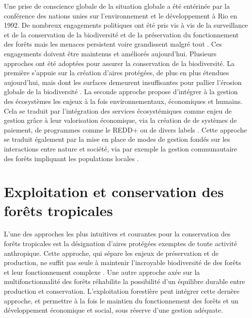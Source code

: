 \documentclass[
  11pt,
  french,
  A4paper,
  extrafontsizes,onecolumn,openright
  ]{memoir}
\begin{document}
Une prise de conscience globale de la situation globale a été entérinée
par la conférence des nations unies sur l'environnement et le
développement à Rio en 1992. De nombreux engagements politiques ont été
pris vis à vis de la surveillance et de la conservation de la
biodiversité et de la préservation du fonctionnement des forêts mais les
menaces persistent voire grandissent malgré tout
\autocites{Summit1992}{Schlaepfer2000}{Dirzo2003a}{Morales-Hidalgo2015}.
Ces engagements doivent être maintenus et améliorés aujourd'hui.
Plusieurs approches ont été adoptées pour assurer la conservation de la
biodiversité. La première s'appuie sur la création d'aires protégées, de
plus en plus étendues aujourd'hui, mais dont les surfaces demeurent
insuffisantes pour pallier l'érosion globale de la biodiversité
\autocite{Sist2015}. La seconde approche propose d'intégrer à la gestion
des écosystèmes les enjeux à la fois environnementaux, économiques et
humains. Cela se traduit par l'intégration des services écosystémiques
comme enjeu de gestion grâce à leur valorisation économique, via la
création de de systèmes de paiement, de programmes comme le REDD+ ou de
divers labels \autocites{Agrawal2011}{Barlow2018}. Cette approche se
traduit également par la mise en place de modes de gestion fondés sur
les interactions entre nature et société, via par exemple la gestion
communautaire des forêts impliquant les populations locales
\autocite{Liu2015}.

\section{Exploitation et conservation des forêts
tropicales}\label{exploitation-et-conservation-des-forets-tropicales}

L'une des approches les plus intuitives et courantes pour la
conservation des forêts tropicales est la désignation d'aires protégées
exemptes de toute activité anthropique. Cette approche, qui sépare les
enjeux de préservation et de production, ne suffit pas seule à maintenir
l'incroyable biodiversité de des forêts et leur fonctionnement complexe
\autocite{Sist2015}. Une autre approche axée sur la multifonctionnalité
des forêts réhabilite la possibilité d'un équilibre durable entre
production et conservation. L'exploitation forestière peut intégrer
cette dernère approche, et permettre à la fois le maintien du
fonctionnement des forêts et un développement économique et social, sous
réserve d'une gestion adéquate.
\end{document}
